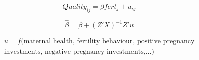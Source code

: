 
\begin{equation}
Quality_{ij}=\beta fert_{j}+u_{ij}
\end{equation}

\begin{equation}
\label{TWINeqn:IVbias}
\hat\beta=\beta+(Z'X)^{-1}Z'u
\end{equation}


\begin{equation}
\label{TWINeqn:IVbias}
\begin{split}
u=f(\text{maternal health, fertility behaviour, positive pregnancy}  \\
\text{investments, negative pregnancy investments,}\ldots)
\end{split}
\end{equation}

